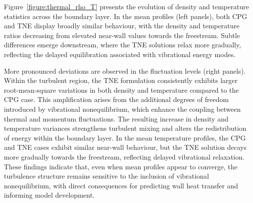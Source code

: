 Figure~\ref{figure:thermal_rho_T} presents the evolution of density and temperature statistics across the boundary layer. In the mean profiles (left panels), both \gls{CPG} and \gls{TNE} display broadly similar behaviour, with the density and temperature ratios decreasing from elevated near-wall values towards the freestream. Subtle differences emerge downstream, where the \gls{TNE} solutions relax more gradually, reflecting the delayed equilibration associated with vibrational energy modes.

More pronounced deviations are observed in the fluctuation levels (right panels). Within the turbulent region, the \gls{TNE} formulation consistently exhibits larger root-mean-square variations in both density and temperature compared to the \gls{CPG} case. This amplification arises from the additional degrees of freedom introduced by vibrational nonequilibrium, which enhance the coupling between thermal and momentum fluctuations. The resulting increase in density and temperature variances strengthens turbulent mixing and alters the redistribution of energy within the boundary layer. In the mean temperature profiles, the \gls{CPG} and \gls{TNE} cases exhibit similar near-wall behaviour, but the \gls{TNE} solution decays more gradually towards the freestream, reflecting delayed vibrational relaxation. These findings indicate that, even when mean profiles appear to converge, the turbulence structure remains sensitive to the inclusion of vibrational nonequilibrium, with direct consequences for predicting wall heat transfer and informing model development.





